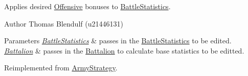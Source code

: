 Applies desired \mbox{\hyperlink{class_offensive}{Offensive}} bonuses to \mbox{\hyperlink{class_battle_statistics}{Battle\+Statistics}}. 

\begin{DoxyAuthor}{Author}
Thomas Blendulf (u21446131) 
\end{DoxyAuthor}

\begin{DoxyParams}{Parameters}
{\em \mbox{\hyperlink{class_battle_statistics}{Battle\+Statistics}}} & passes in the \mbox{\hyperlink{class_battle_statistics}{Battle\+Statistics}} to be edited. \\
\hline
{\em \mbox{\hyperlink{class_battalion}{Battalion}}} & passes in the \mbox{\hyperlink{class_battalion}{Battalion}} to calculate base statistics to be editted. \\
\hline
\end{DoxyParams}


Reimplemented from \mbox{\hyperlink{class_army_strategy_ade28f2b5107c9fcdc58e73e1053e6cff}{Army\+Strategy}}.

